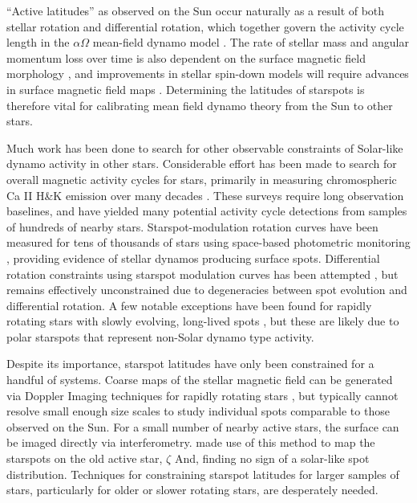 \documentclass[preprint2]{aastex62}
\begin{document}
``Active latitudes'' as observed on the Sun occur naturally as a result of both stellar rotation and differential rotation, which together govern the activity cycle length in the $\alpha\Omega$ mean-field dynamo model \citep{brandenburg2005}. The rate of stellar mass and angular momentum loss over time is also dependent on the surface magnetic field morphology \citep{garraffo2015}, and improvements in stellar spin-down models will require advances in surface magnetic field maps \citep{garraffo2016}.
Determining the latitudes of starspots is therefore vital for calibrating mean field dynamo theory from the Sun to other stars.



Much work has been done to search for other observable constraints of Solar-like dynamo activity in other stars.
Considerable effort has been made to search for overall magnetic activity cycles for stars, primarily in measuring chromospheric Ca II H\&K emission over many decades \citep[e.g.]{wilson1978,baliunas1995}. These surveys require long observation baselines, and have yielded many potential activity cycle detections from samples of hundreds of nearby stars. Starspot-modulation rotation curves have been measured for tens of thousands of stars using space-based photometric monitoring \citep{mcquillan2014}, providing evidence of stellar dynamos producing surface spots. Differential rotation constraints using starspot modulation curves has been attempted \citep[e.g.][]{reinhold2013}, but remains effectively unconstrained due to degeneracies between spot evolution and differential rotation\citep{aigrain2015}. A few notable exceptions have been found for rapidly rotating stars with slowly evolving, long-lived spots \citep[e.g.][]{morin2008a,davenport2015b}, but these are likely due to polar starspots that represent non-Solar dynamo type activity. 


Despite its importance, starspot latitudes have only been constrained for a handful of systems. %
Coarse maps of the stellar magnetic field can be generated via Doppler Imaging techniques for rapidly rotating stars \citep{semel1989,donati_brown1997}, but typically cannot resolve small enough size scales to study individual spots comparable to those observed on the Sun.
For a small number of nearby active stars, the surface can be imaged directly via interferometry. \cite{roettenbacher2016} made use of this method to map the starspots on the old active star, $\zeta$ And, finding no sign of a solar-like spot distribution. Techniques for constraining starspot latitudes for larger samples of stars, particularly for older or slower rotating stars, are desperately needed.
\end{document}
